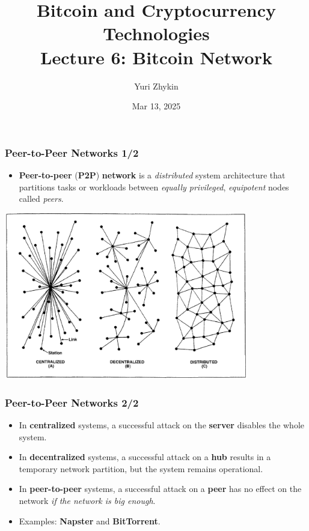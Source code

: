 \documentclass{beamer}
\title{
  Bitcoin and Cryptocurrency Technologies \\
  Lecture 6: Bitcoin Network
}
\author{Yuri Zhykin}
\date{Mar 13, 2025}
\begin{document}
\frame{\titlepage}

\begin{frame}
  \frametitle{Peer-to-Peer Networks 1/2}
  \begin{itemize}
  \item \textbf{Peer-to-peer} (\textbf{P2P}) \textbf{network} is a
    \textit{distributed} system architecture that partitions tasks or workloads
    between \textit{equally privileged}, \textit{equipotent} nodes called
    \textit{peers}.
  \end{itemize}
  \begin{center}
    \includegraphics[width=0.8\textwidth]{networks}
  \end{center}
\end{frame}

\begin{frame}
  \frametitle{Peer-to-Peer Networks 2/2}
  \begin{itemize}
  \item In \textbf{centralized} systems, a successful attack on the \textbf{server}
    disables the whole system.
  \item In \textbf{decentralized} systems, a successful attack on a \textbf{hub}
    results in a temporary network partition, but the system remains
    operational.
  \item In \textbf{peer-to-peer} systems, a successful attack on a \textbf{peer}
    has no effect on the network \textit{if the network is big enough}.
  \item Examples: \textbf{Napster} and \textbf{BitTorrent}.
  \end{itemize}
\end{frame}
\end{document}
